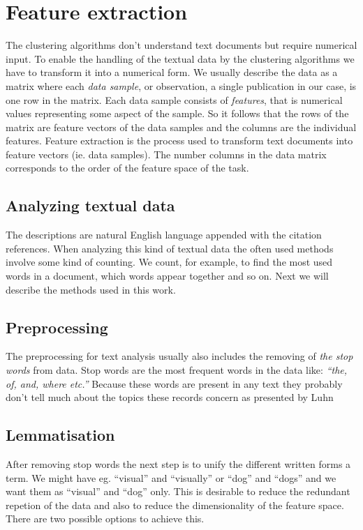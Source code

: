

 
\section{Feature extraction}
The clustering algorithms don't understand text documents but 
require numerical input. To enable the handling of the textual 
data by the clustering algorithms we have to transform it into a
numerical form. We usually describe the data as a matrix where 
each \emph{data sample}, or observation, a single publication in 
our case, is one row in the matrix. Each data sample consists of
\emph{features}, that is numerical values representing some aspect
of the sample. So it follows that the rows of the matrix are 
feature vectors of the data samples and the columns are the 
individual features. Feature extraction is the process used to 
transform text documents into feature vectors (ie. data samples).
The number columns in the data matrix corresponds to the order of 
the feature space of the task.

\subsection{Analyzing textual data}
The descriptions are natural English language appended with the 
citation references. When analyzing 
this kind of textual data the often used methods involve some 
kind of counting. We count, for example, to find the most used 
words in a document, which words appear together and so on.
Next we will describe the methods used in this work.


\subsection{Preprocessing}
The preprocessing for text analysis usually also includes the 
removing of \emph{the stop words} from data. Stop words are the 
most frequent words in the data like: \emph{``the, of, and, where 
etc.''} Because these words are present in any text they probably 
don't tell much about the topics these records concern as 
presented by Luhn \cite{luhn_key_1960}


\subsection{Lemmatisation}
After removing stop words the next step is to unify the 
different written forms a term. We might have eg. ``visual'' 
and ``visually'' or ``dog'' and ``dogs'' and we want them as 
``visual'' and ``dog'' only. This is desirable to reduce the 
redundant repetion of the data and also to reduce the dimensionality of 
the feature space. \cite{siemens_lemmatization_1996} 
\cite{hann_towards_1975}
There are two possible options to achieve this. 


